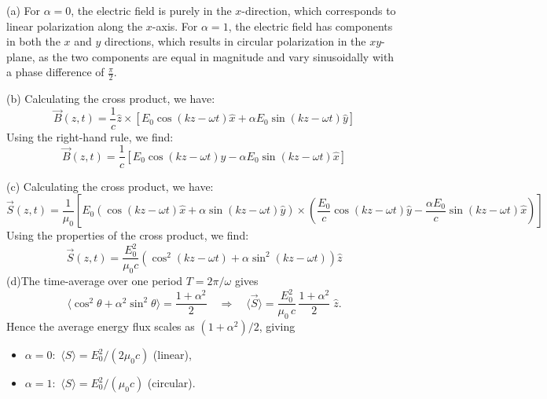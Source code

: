  \begin{solution}
(a) For $\alpha = 0$, the electric field is purely in the $x$-direction, which corresponds to linear polarization along the $x$-axis. For $\alpha = 1$, the electric field has components in both the $x$ and $y$ directions, which results in circular polarization in the $xy$-plane, as the two components are equal in magnitude and vary sinusoidally with a phase difference of $\frac{\pi}{2}$.

\noindent
(b) Calculating the cross product, we have:
\[
\vec{B}(z,t) = \frac{1}{c} \hat{z} \times \left[ E_0 \cos(kz - \omega t) \hat{x} + \alpha E_0 \sin(kz - \omega t) \hat{y} \right]
\]
Using the right-hand rule, we find:
\[
\boxed{
\vec{B}(z,t) = \frac{1}{c} \left[ E_0 \cos(kz - \omega t) \hat{y} - \alpha E_0 \sin(kz - \omega t) \hat{x} \right]
}\]

\noindent
(c)
Calculating the cross product, we have:
\[
\vec{S}(z,t) = \frac{1}{\mu_0} \left[ E_0 \left( \cos(kz - \omega t) \hat{x} + \alpha \sin(kz - \omega t) \hat{y} \right) \times \left( \frac{E_0}{c} \cos(kz - \omega t) \hat{y} - \frac{\alpha E_0}{c} \sin(kz - \omega t) \hat{x} \right) \right]
\]
Using the properties of the cross product, we find:
\[\boxed{
\vec{S}(z,t) = \frac{E_0^2}{\mu_0 c} \left( \cos^2(kz - \omega t) + \alpha \sin^2(kz - \omega t) \right) \hat{z}
}\]
\noindent
(d)The time-average over one period $T=2\pi/\omega$ gives
  \[
    \bigl\langle\cos^2\theta+\alpha^2\sin^2\theta\bigr\rangle
    = \frac{1+\alpha^2}{2}
    \quad\Longrightarrow\quad
    \boxed{\langle\vec{S}\rangle
      = \frac{E_0^2}{\mu_0\,c}\,\frac{1+\alpha^2}{2}\;\hat{z}.}
  \]
  Hence the average energy flux scales as $(1+\alpha^2)/2$, giving
  \begin{itemize}
    \item $\alpha=0$:~$\langle S\rangle=E_0^2/(2\mu_0c)$ (linear),
    \item $\alpha=1$:~$\langle S\rangle=E_0^2/(\mu_0c)$ (circular).
  \end{itemize}
\end{solution}